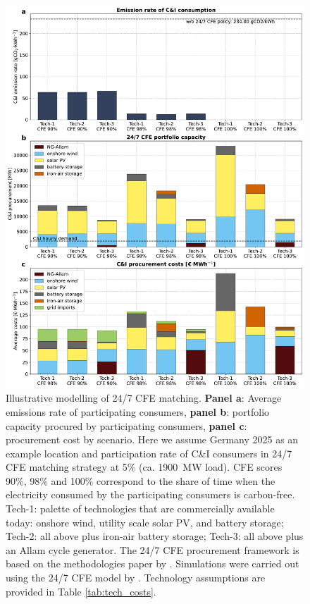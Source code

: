 \documentclass[pdflatex,sn-basic, Numbered]{sn-jnl}
\theoremstyle{thmstyleone}%
\theoremstyle{thmstyletwo}%
\theoremstyle{thmstylethree}%
\begin{document}
\begin{figure}[htbp]
    \centering
    \includegraphics[width=\textwidth]{images/dashboard_247CFE.pdf}
    \captionsetup{width=\textwidth}
    \caption{Illustrative modelling of 24/7 CFE matching.
    \textbf{Panel a}: Average emissions rate of participating consumers,
    \textbf{panel b}: portfolio capacity procured by participating consumers,
    \textbf{panel c}: procurement cost by scenario.
    Here we assume Germany 2025 as an example location and participation rate of C\&I consumers in 24/7 CFE matching strategy at 5\% (ca. 1900~MW load).
    CFE scores 90\%, 98\% and 100\% correspond to the share of time when the electricity consumed by the participating consumers is carbon-free.
    Tech-1: palette of technologies that are commercially available today: onshore wind, utility scale solar PV, and battery storage; Tech-2: all above plus iron-air battery storage; Tech-3: all above plus an Allam cycle generator. The 24/7 CFE procurement framework is based on the methodologies paper by \citet{google-methodologies}. Simulations were carried out using the 24/7 CFE model by \citet{riepin-zenodo-systemlevel247}. Technology assumptions are provided in Table \ref{tab:tech_costs}.\\
    }\label{fig:dashboard}
\end{figure}
\end{document}

